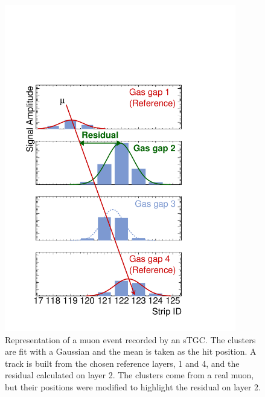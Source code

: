 \begin{figure}
    \centering
    \includegraphics[width = 0.9\textwidth]{figures/figure_fake_event_display.pdf}
    \caption{Representation of a muon event recorded by an sTGC. The clusters are fit with a Gaussian and the mean is taken as the hit position. A track is built from the chosen reference layers, 1 and 4, and the residual calculated on layer 2. The clusters come from a real muon, but their positions were modified to highlight the residual on layer 2.}
    \label{fig:fake_event_display}
\end{figure}

